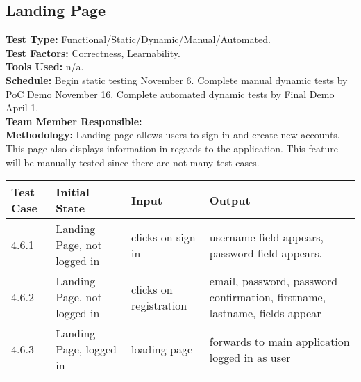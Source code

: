 \documentclass[12pt]{article}
\begin{document}
\subsection{Landing Page}
\textbf{Test Type:} Functional/Static/Dynamic/Manual/Automated. \\
\textbf{Test Factors:} Correctness, Learnability. \\
\textbf{Tools Used:} n/a. \\
\textbf{Schedule:} Begin static testing November 6. Complete manual dynamic tests by PoC Demo November 16. Complete automated dynamic tests by Final Demo April 1. \\
\textbf{Team Member Responsible:} \\
\textbf{Methodology:} Landing page allows users to sign in and create new accounts. This page also displays information in regards to the application. This feature will be manually tested since there are not many test cases.

\begin{longtable}{|p{2cm}|p{3cm}|p{5cm}|p{5cm}|}
\hline
\textbf{Test Case}  & \textbf{Initial State} & \textbf{Input} & \textbf{Output} \\ \hline
4.6.1 & Landing Page, not logged in & clicks on sign in & username field appears, password field appears.\\
\hline
4.6.2 & Landing Page, not logged in & clicks on registration & email, password, password confirmation, firstname, lastname, fields appear\\
\hline
4.6.3 & Landing Page, logged in & loading page & forwards to main application logged in as user\\
\hline
\end{longtable}


\end{document}
